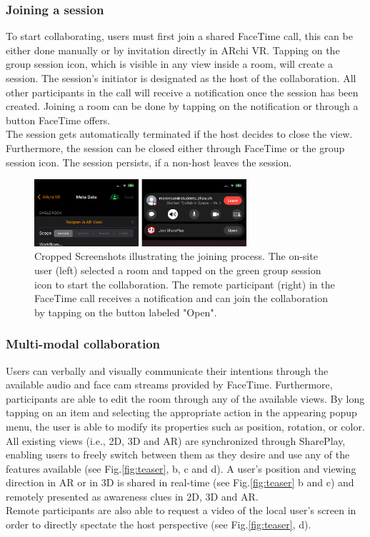 \documentclass{article}
\begin{document}
\subsubsection{Joining a session} \label{basis}
To start collaborating, users must first join a shared FaceTime call, this can be either done manually or by invitation directly in ARchi VR. Tapping on the group session icon, which is visible in any view inside a room, will create a session. The session's initiator is designated as the host of the collaboration. All other participants in the call will receive a notification once the session has been created. Joining a room can be done by tapping on the notification or through a button FaceTime offers. \\  
The session gets automatically terminated if the host decides to close the view. Furthermore, the session can be closed either through FaceTime or the group session icon. The session persists, if a non-host leaves the session.
\begin{figure}[H]
  \centering
  \includegraphics[width=0.7\textwidth]{img/session_join_screenshot.png}
  \caption{Cropped Screenshots illustrating the joining process. The on-site user (left) selected a room and tapped on the green group session icon to start the collaboration. The remote participant (right) in the FaceTime call receives a notification and can join the collaboration by tapping on the button labeled "Open". }\label{screenshot:join}
\end{figure}
\subsubsection{Multi-modal collaboration} \label{basis}
Users can verbally and visually communicate their intentions through the available audio and face cam streams provided by FaceTime. Furthermore, participants are able to edit the room through any of the available views. By long tapping on an item and selecting the appropriate action in the appearing popup menu, the user is able to modify its properties such as position, rotation, or color. All existing views (i.e., 2D, 3D and AR) are synchronized through SharePlay, enabling users to freely switch between them as they desire and use any of the features available (see Fig.\ref{fig:teaser}, b, c and d). A user's position and viewing direction in AR or in 3D is shared in real-time (see Fig.\ref{fig:teaser} b and c) and remotely presented as awareness clues in 2D, 3D and AR. \\
Remote participants are also able to request a video of the local user's screen in order to directly spectate the host perspective (see Fig.\ref{fig:teaser}, d). 
\end{document}
